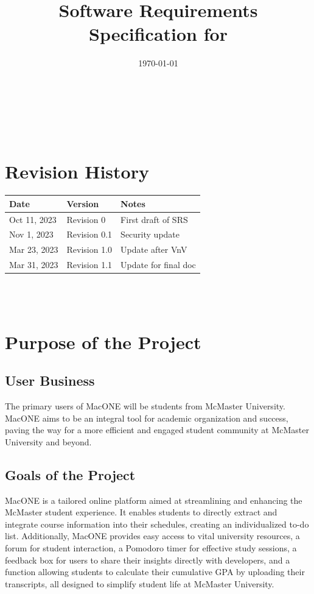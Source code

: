 \documentclass[12pt]{article}
\begin{document}
\title{Software Requirements Specification for \progname} 
\author{\authname}
\date{\today}
	
\maketitle
~\newpage


\tableofcontents

~\newpage

\section*{Revision History}

\begin{tabularx}{\textwidth}{p{3cm}p{2cm}X}
\toprule {\textbf{Date}} & {\textbf{Version}} & {\textbf{Notes}}\\
\midrule
Oct 11, 2023 & Revision 0 & First draft of SRS \\
Nov 1, 2023 & Revision 0.1 & Security update \\
Mar 23, 2023 & Revision 1.0 & Update after VnV \\
Mar 31, 2023 & Revision 1.1 & Update for final doc \\
\bottomrule
\end{tabularx}

~\\

~\newpage
\section{Purpose of the Project}
\subsection{User Business}
The primary users of MacONE will be students from McMaster University. MacONE aims to be an integral tool for academic organization and success, paving the way for a more efficient and engaged student community at McMaster University and beyond.
\subsection{Goals of the Project}
MacONE is a tailored online platform aimed at streamlining and enhancing the McMaster student experience. It enables students to directly extract and integrate course information into their schedules, creating an individualized to-do list. Additionally, MacONE provides easy access to vital university resources, a forum for student interaction, a Pomodoro timer for effective study sessions, a feedback box for users to share their insights directly with developers, and a function allowing students to calculate their cumulative GPA by uploading their transcripts, all designed to simplify student life at McMaster University.
\end{document}
